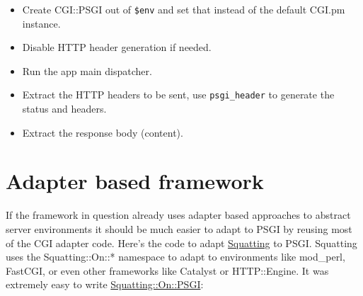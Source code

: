 \begin{itemize}
\itemsep1pt\parskip0pt
\item
  Create CGI::PSGI out of \lstinline!$env! and set that instead of the
  default CGI.pm instance.
\item
  Disable HTTP header generation if needed.
\item
  Run the app main dispatcher.
\item
  Extract the HTTP headers to be sent, use \lstinline!psgi_header! to
  generate the status and headers.
\item
  Extract the response body (content).
\end{itemize}

\section{Adapter based framework}\label{adapter-based-framework}

If the framework in question already uses adapter based approaches to
abstract server environments it should be much easier to adapt to PSGI
by reusing most of the CGI adapter code. Here's the code to adapt
\href{http://search.cpan.org/perldoc?Squatting}{Squatting} to PSGI.
Squatting uses the Squatting::On::* namespace to adapt to environments
like mod\_perl, FastCGI, or even other frameworks like Catalyst or
HTTP::Engine. It was extremely easy to write
\href{http://search.cpan.org/perldoc?Squatting::On::PSGI}{Squatting::On::PSGI}:

